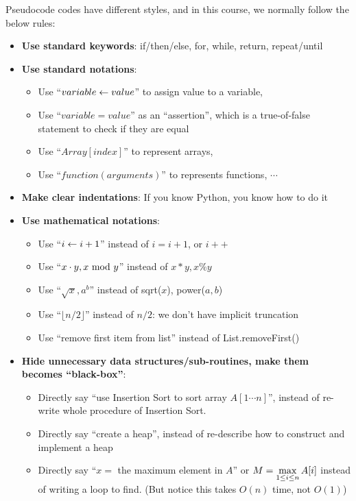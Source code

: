 \begin{spacing}{1.3}
    Pseudocode codes have different styles, and in this course, we normally 
    follow the below rules:
    \begin{itemize}
        \item {\bf Use standard keywords}: if/then/else, for, while, return, repeat/until 
        \item {\bf Use standard notations}: 
            \begin{itemize}
                \item Use ``$variable \leftarrow value$'' to assign value to a variable,
                \item Use ``$variable = value$'' as an ``assertion'', which is a true-of-false 
                statement to check if they are equal
                \item Use ``$Array[index]$'' to represent arrays, 
                \item Use ``$function(arguments)$'' to represents functions, $\cdots$
            \end{itemize}
        \item {\bf Make clear indentations}: If you know Python, you know how to do it
        \item {\bf Use mathematical notations}:
            \begin{itemize}
                \item Use ``$i\leftarrow i+1$'' instead of $i=i+1$, or $i++$
                \item Use ``$x\cdot y, x\ {\rm mod}\ y$'' instead of $x*y, x\% y$
                \item Use ``$\sqrt{x}, a^b$'' instead of sqrt($x$), power($a,b$)
                \item Use ``$\lfloor n/2 \rfloor$'' instead of $n/2$: we don't have implicit truncation
                \item Use ``remove first item from list'' instead of List.removeFirst()
            \end{itemize}
        \item {\bf Hide unnecessary data structures/sub-routines, make them becomes ``black-box''}:
            \begin{itemize}
                \item Directly say ``use Insertion Sort to sort array $A[1\cdots n]$'', instead of 
                re-write whole procedure of Insertion Sort.
                \item Directly say ``create a heap'', instead of re-describe how to construct 
                and implement a heap
                \item Directly say ``$x=$ the maximum element in $A$'' or 
                $\displaystyle M=\max_{1\le i\le n} A[i]$ instead of writing a loop to find.
                (But notice this takes $O(n)$ time, not $O(1)$)
            \end{itemize}
    \end{itemize}


\end{spacing}

